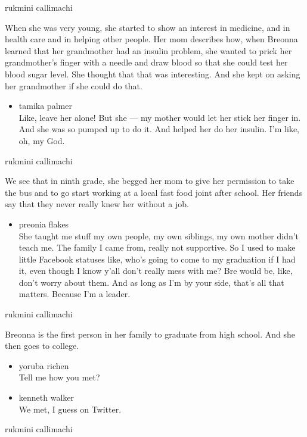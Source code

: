 rukmini callimachi

When she was very young, she started to show an interest in medicine,
and in health care and in helping other people. Her mom describes how,
when Breonna learned that her grandmother had an insulin problem, she
wanted to prick her grandmother's finger with a needle and draw blood so
that she could test her blood sugar level. She thought that that was
interesting. And she kept on asking her grandmother if she could do
that.

\begin{itemize}
\tightlist
\item
  tamika palmer\\
  Like, leave her alone! But she --- my mother would let her stick her
  finger in. And she was so pumped up to do it. And helped her do her
  insulin. I'm like, oh, my God.
\end{itemize}

rukmini callimachi

We see that in ninth grade, she begged her mom to give her permission to
take the bus and to go start working at a local fast food joint after
school. Her friends say that they never really knew her without a job.

\begin{itemize}
\tightlist
\item
  preonia flakes\\
  She taught me stuff my own people, my own siblings, my own mother
  didn't teach me. The family I came from, really not supportive. So I
  used to make little Facebook statuses like, who's going to come to my
  graduation if I had it, even though I know y'all don't really mess
  with me? Bre would be, like, don't worry about them. And as long as
  I'm by your side, that's all that matters. Because I'm a leader.
\end{itemize}

rukmini callimachi

Breonna is the first person in her family to graduate from high school.
And she then goes to college.

\begin{itemize}
\item
  yoruba richen\\
  Tell me how you met?
\item
  kenneth walker\\
  We met, I guess on Twitter.
\end{itemize}

rukmini callimachi

